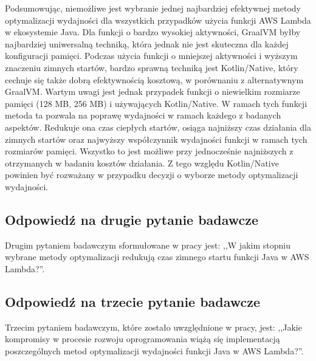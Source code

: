 Podsumowując, niemożliwe jest wybranie jednej najbardziej efektywnej metody optymalizacji wydajności dla wszystkich przypadków użycia funkcji AWS Lambda w ekosystemie Java.
Dla funkcji o bardzo wysokiej aktywności, GraalVM byłby najbardziej uniwersalną techniką, która jednak nie jest skuteczna dla każdej konfiguracji pamięci.
Podczas użycia funkcji o mniejszej aktywności i wyższym znaczeniu zimnych startów, bardzo sprawną techniką jest Kotlin/Native, który cechuje się także dobrą efektywnością kosztową, w porównaniu z alternatywnym GraalVM.
Wartym uwagi jest jednak przypadek funkcji o niewielkim rozmiarze pamięci (128 MB, 256 MB) i używających Kotlin/Native.
W ramach tych funkcji metoda ta pozwala na poprawę wydajności w ramach każdego z badanych aspektów.
Redukuje ona czas ciepłych startów, osiąga najniższy czas działania dla zimnych startów oraz najwyższy współczynnik wydajności funkcji w ramach tych rozmiarów pamięci.
Wszystko to jest możliwe przy jednocześnie najniższych z otrzymanych w badaniu kosztów działania.
Z tego względu Kotlin/Native powinien być rozważany w przypadku decyzji o wyborze metody optymalizacji wydajności.

\subsection*{Odpowiedź na drugie pytanie badawcze}

Drugim pytaniem badawczym sformułowane w pracy jest: ,,W jakim stopniu wybrane metody optymalizacji redukują czas zimnego startu funkcji Java w AWS Lambda?''.

\subsection*{Odpowiedź na trzecie pytanie badawcze}

Trzecim pytaniem badawczym, które zostało uwzględnione w pracy, jest: ,,Jakie kompromisy w procesie rozwoju oprogramowania wiążą się implementacją poszczególnych metod optymalizacji wydajności funkcji Java w AWS Lambda?''.